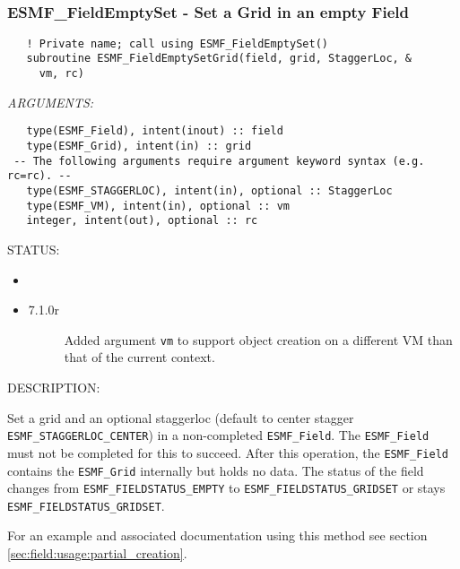  
\mbox{}\hrulefill\ 
 
\subsubsection [ESMF\_FieldEmptySet] {ESMF\_FieldEmptySet - Set a Grid in an empty Field}


\begin{verbatim}   ! Private name; call using ESMF_FieldEmptySet()
   subroutine ESMF_FieldEmptySetGrid(field, grid, StaggerLoc, &
     vm, rc)\end{verbatim}{\em ARGUMENTS:}
\begin{verbatim}   type(ESMF_Field), intent(inout) :: field
   type(ESMF_Grid), intent(in) :: grid
 -- The following arguments require argument keyword syntax (e.g. rc=rc). --
   type(ESMF_STAGGERLOC), intent(in), optional :: StaggerLoc
   type(ESMF_VM), intent(in), optional :: vm
   integer, intent(out), optional :: rc\end{verbatim}
{\sf STATUS:}
   \begin{itemize}
   \item{}
   \item{}
   \begin{description}
   \item[7.1.0r] Added argument {\tt vm} to support object creation on a
   different VM than that of the current context.
   \end{description}
   \end{itemize}
  
{\sf DESCRIPTION:\\ }


   \begin{sloppypar}
   Set a grid and an optional staggerloc (default to center stagger
   {\tt ESMF\_STAGGERLOC\_CENTER}) in a non-completed {\tt ESMF\_Field}. The
   {\tt ESMF\_Field} must not be completed for this to succeed. After this
   operation, the {\tt ESMF\_Field} contains
   the {\tt ESMF\_Grid} internally but holds no data.
   The status of the field changes from
   {\tt ESMF\_FIELDSTATUS\_EMPTY} to {\tt ESMF\_FIELDSTATUS\_GRIDSET} or
   stays {\tt ESMF\_FIELDSTATUS\_GRIDSET}.
  
   For an example and
   associated documentation using this method see section
   \ref{sec:field:usage:partial_creation}.
   \end{sloppypar}
  
